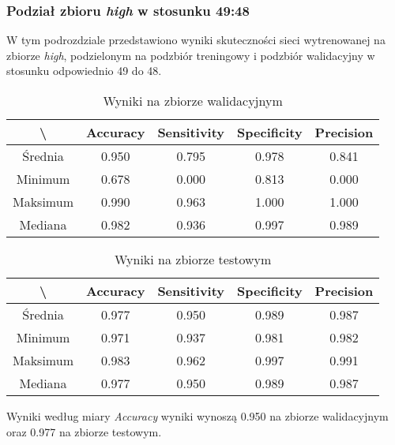 \subsubsection{Podział zbioru \textit{high} w stosunku 49:48}

W tym podrozdziale przedstawiono wyniki skuteczności sieci wytrenowanej na zbiorze \textit{high}, podzielonym na podzbiór treningowy i podzbiór walidacyjny w stosunku odpowiednio 49 do 48.

\begin{table}[!h]
	\centering
	\caption{Wyniki na zbiorze walidacyjnym}
	\vspace{6pt}
	{\footnotesize
		\begin{tabular}{|c|c|c|c|c|}
      \hline \textbackslash & Accuracy & Sensitivity & Specificity & Precision \\
      \hline Średnia & 0.950 & 0.795 & 0.978 & 0.841 \\
      \hline Minimum & 0.678 & 0.000 & 0.813 & 0.000 \\
      \hline Maksimum & 0.990 & 0.963 & 1.000 & 1.000 \\
      \hline Mediana & 0.982 & 0.936 & 0.997 & 0.989 \\
      \hline
		\end{tabular}
	}
	\vspace{0pt}
\end{table}

\begin{table}[!h]
	\centering
	\caption{Wyniki na zbiorze testowym}
	\vspace{6pt}
	{\footnotesize
		\begin{tabular}{|c|c|c|c|c|}
      \hline \textbackslash & Accuracy & Sensitivity & Specificity & Precision \\
      \hline Średnia & 0.977 & 0.950 & 0.989 & 0.987 \\
      \hline Minimum & 0.971 & 0.937 & 0.981 & 0.982 \\
      \hline Maksimum & 0.983 & 0.962 & 0.997 & 0.991 \\
      \hline Mediana & 0.977 & 0.950 & 0.989 & 0.987 \\
      \hline
		\end{tabular}
	}
	\vspace{0pt}
\end{table}

Wyniki według miary \textit{Accuracy} wyniki wynoszą 0.950 na zbiorze walidacyjnym oraz 0.977 na zbiorze testowym.
